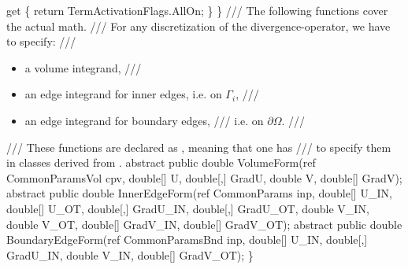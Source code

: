 {\btab    get \{ \newline 
\btab \btab    return TermActivationFlags.AllOn; \newline 
\btab \btab \} \newline 
\btab \} \newline 
 \newline 
    /// The following functions cover the actual math.
    /// For any discretization of the divergence-operator, we have to specify:
    /// \begin{itemize}
    ///    \item a volume integrand,
    ///    \item an edge integrand for inner edges, i.e. on $ \Gamma_i$,
    ///    \item an edge integrand for boundary edges, 
    ///          i.e. on $\partial \Omega$.
    /// \end{itemize}
    /// These functions are declared as , meaning that one has 
    /// to specify them in classes derived from .
 \newline 
\btab abstract public double VolumeForm(ref CommonParamsVol cpv,  \newline 
\btab \btab    double[] U, double[,] GradU,  \newline 
\btab \btab    double V, double[] GradV);         \newline 
 \newline 
\btab abstract public double InnerEdgeForm(ref CommonParams inp,  \newline 
\btab \btab double[] U\_IN, double[] U\_OT, double[,] GradU\_IN, double[,] GradU\_OT,  \newline 
\btab \btab double V\_IN, double V\_OT, double[] GradV\_IN, double[] GradV\_OT); \newline 
 \newline 
\btab abstract public double BoundaryEdgeForm(ref CommonParamsBnd inp,  \newline 
\btab \btab double[] U\_IN, double[,] GradU\_IN, double V\_IN, double[] GradV\_OT); \newline 
\}
 }
\BoSSSexe
{}
